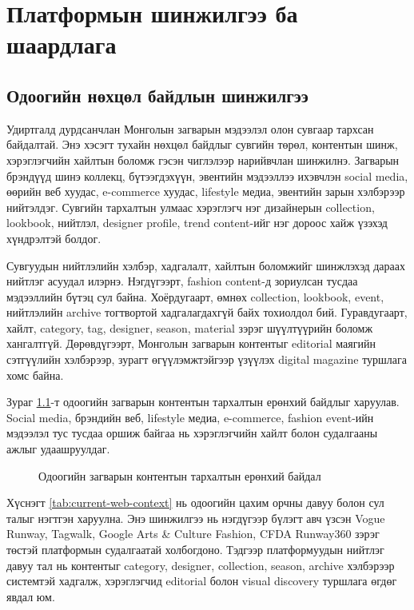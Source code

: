 
\chapter{Платформын шинжилгээ ба шаардлага}
\label{Chapter2}

\section{Одоогийн нөхцөл байдлын шинжилгээ}
Удиртгалд дурдсанчлан Монголын загварын мэдээлэл олон сувгаар тархсан байдалтай. Энэ хэсэгт тухайн нөхцөл байдлыг сувгийн төрөл, контентын шинж, хэрэглэгчийн хайлтын боломж гэсэн чиглэлээр нарийвчлан шинжилнэ. Загварын брэндүүд шинэ коллекц, бүтээгдэхүүн, эвентийн мэдээллээ ихэвчлэн social media, өөрийн веб хуудас, e-commerce хуудас, lifestyle медиа, эвентийн зарын хэлбэрээр нийтэлдэг. Сувгийн тархалтын улмаас хэрэглэгч нэг дизайнерын collection, lookbook, нийтлэл, designer profile, trend content-ийг нэг дороос хайж үзэхэд хүндрэлтэй болдог.

Сувгуудын нийтлэлийн хэлбэр, хадгалалт, хайлтын боломжийг шинжлэхэд дараах нийтлэг асуудал илэрнэ. Нэгдүгээрт, fashion content-д зориулсан тусдаа мэдээллийн бүтэц сул байна. Хоёрдугаарт, өмнөх collection, lookbook, event, нийтлэлийн archive тогтвортой хадгалагдахгүй байх тохиолдол бий. Гуравдугаарт, хайлт, category, tag, designer, season, material зэрэг шүүлтүүрийн боломж хангалтгүй. Дөрөвдүгээрт, Монголын загварын контентыг editorial маягийн сэтгүүлийн хэлбэрээр, зурагт өгүүлэмжтэйгээр үзүүлэх digital magazine туршлага хомс байна.

Зураг \ref{fig:ch2-current-content-distribution}-т одоогийн загварын контентын тархалтын ерөнхий байдлыг харуулав. Social media, брэндийн веб, lifestyle медиа, e-commerce, fashion event-ийн мэдээлэл тус тусдаа оршиж байгаа нь хэрэглэгчийн хайлт болон судалгааны ажлыг удаашруулдаг.
\begin{figure}[htbp]
  \centering
  \resizebox{0.92\textwidth}{!}{}
  \caption[Одоогийн загварын контентын тархалт]{Одоогийн загварын контентын тархалтын ерөнхий байдал}
  \label{fig:ch2-current-content-distribution}
\end{figure}

Хүснэгт \ref{tab:current-web-context} нь одоогийн цахим орчны давуу болон сул талыг нэгтгэн харуулна. Энэ шинжилгээ нь нэгдүгээр бүлэгт авч үзсэн Vogue Runway, Tagwalk, Google Arts \& Culture Fashion, CFDA Runway360 зэрэг төстэй платформын судалгаатай холбогдоно. Тэдгээр платформуудын нийтлэг давуу тал нь контентыг category, designer, collection, season, archive хэлбэрээр системтэй хадгалж, хэрэглэгчид editorial болон visual discovery туршлага өгдөг явдал юм.

